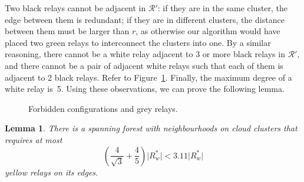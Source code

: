 \documentclass[11pt,a4paper]{article}
\newcommand{\s}[1]{{\lvert #1 \rvert}}
\newcommand{\myR}{\mathcal{R}}
\newcommand{\optrel}{R^{*}}
\newtheorem{lemma}{Lemma}
\theoremstyle{definition}
\theoremstyle{remark}
\begin{document}
Two black relays cannot be adjacent in $\myR'$: if they are in the same cluster, the edge between them is redundant; if they are in different clusters, the distance between them must be larger than $r$, as otherwise our algorithm would have placed two green relays to interconnect the clusters into one. By a similar reasoning, there cannot be a white relay adjacent to 3 or more black relays in $\myR'$, and there cannot be a pair of adjacent white relays such that each of them is adjacent to 2 black relays. Refer to Figure~\ref{fig:forbid}. Finally, the maximum degree of a white relay is~5. Using these observations, we can prove the following lemma.
\begin{figure}\centering
{}
\caption{Forbidden configurations and grey relays.}\label{fig:forbid}
\end{figure}


\begin{lemma}\label{lem_yellow}
    There is a spanning forest with neighbourhoods on cloud clusters that requires at most
    \[
        \left(\frac{4}{\sqrt{3}} + \frac{4}{5}\right) \s{\optrel_w} < 3.11 \s{\optrel_w}
    \]
    yellow relays on its edges.
\end{lemma}
\end{document}
